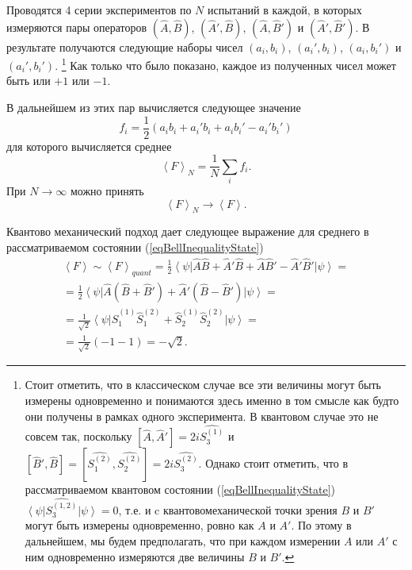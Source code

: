 Проводятся 4 серии экспериментов по $N$ испытаний в каждой, в которых
измеряются пары операторов $\left(\hat{A},\hat{B}\right)$,
$\left(\hat{A}',\hat{B}\right)$, $\left(\hat{A},\hat{B}'\right)$ и
$\left(\hat{A}',\hat{B}'\right)$. В результате получаются следующие
наборы чисел $\left(a_i, b_i\right)$, $\left(a_i', b_i\right)$, $\left(a_i, b_i'\right)$ и
$\left(a_i', b_i'\right)$.
\footnote{
  Стоит отметить, что в классическом случае все эти величины могут
  быть измерены одновременно и понимаются здесь именно в том смысле
  как будто они получены в рамках одного эксперимента.
  В квантовом случае это не совсем так,
  поскольку $\left[\hat{A}, \hat{A}'\right] = 2 i \hat{S_3^{(1)}}$ и
  $\left[\hat{B}', \hat{B}\right] =
  \left[\hat{S_1^{(2)}}, \hat{S_2^{(2)}}\right] =
  2 i \hat{S_3^{(2)}}$. Однако стоит отметить, что в рассматриваемом
  квантовом состоянии (\ref{eqBellInequalityState})
  $\left<\psi\right|\hat{S_3^{(1,2)}}\left|\psi\right> = 0$, т.е. и c
  квантовомеханической точки зрения $B$ и $B'$ могут быть измерены
  одновременно, ровно как $A$ и $A'$. По этому в дальнейшем, мы будем
  предполагать, что при каждом измерении $A$ или $A'$ с ним
  одновременно измеряются две величины $B$ и $B'$.
}
Как только что было показано, каждое
из полученных чисел может быть или $+1$ или $-1$.

В дальнейшем из этих пар вычисляется следующее значение
\begin{equation}
f_i = \frac{1}{2}\left(
a_i b_i + a_i' b_i + a_i b_i' - a_i' b_i'
\right)
\nonumber
\end{equation}
для которого вычисляется среднее
\begin{equation}
\left<F\right>_N = \frac{1}{N}\sum_i f_i.
\label{eqEntangFmain}
\end{equation}
При $N \rightarrow \infty$ можно принять
\begin{equation}
\left<F\right>_N \rightarrow \left<F\right>.
\nonumber
\end{equation}

Квантово механический подход дает следующее выражение для среднего в
рассматриваемом состоянии (\ref{eqBellInequalityState}) 
\begin{eqnarray}
 \left<F\right> \sim \left<F\right>_{quant} 
=\frac{1}{2}
\left<\psi\right|
\hat{A}\hat{B} + \hat{A}'\hat{B} + \hat{A}\hat{B}' - \hat{A}'\hat{B}'
\left|\psi\right> = 
\nonumber \\
=\frac{1}{2}
\left<\psi\right|
\hat{A}\left(\hat{B} + \hat{B}'\right) + \hat{A}' \left(\hat{B}  -
\hat{B}' \right)
\left|\psi\right> = 
\nonumber \\
= \frac{1}{\sqrt{2}}
\left<\psi\right|
\hat{S}_1^{(1)}\hat{S}_1^{(2)} + \hat{S}_2^{(1)}\hat{S}_2^{(2)}
\left|\psi\right> =
\nonumber \\
= \frac{1}{\sqrt{2}}
\left(-1 - 1\right) = - \sqrt{2}.
\label{eqEntangQuant}
\end{eqnarray}

